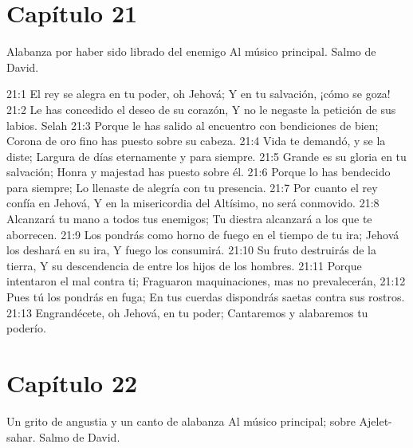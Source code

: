 \section*{Capítulo 21}
Alabanza por haber sido librado del enemigo 
Al músico principal. Salmo de David. 

21:1 El rey se alegra en tu poder, oh Jehová; 
Y en tu salvación, ¡cómo se goza! 
21:2 Le has concedido el deseo de su corazón, 
Y no le negaste la petición de sus labios. Selah 
21:3 Porque le has salido al encuentro con bendiciones de bien; 
Corona de oro fino has puesto sobre su cabeza. 
21:4 Vida te demandó, y se la diste; 
Largura de días eternamente y para siempre. 
21:5 Grande es su gloria en tu salvación; 
Honra y majestad has puesto sobre él. 
21:6 Porque lo has bendecido para siempre; 
Lo llenaste de alegría con tu presencia. 
21:7 Por cuanto el rey confía en Jehová, 
Y en la misericordia del Altísimo, no será conmovido. 
21:8 Alcanzará tu mano a todos tus enemigos; 
Tu diestra alcanzará a los que te aborrecen. 
21:9 Los pondrás como horno de fuego en el tiempo de tu ira; 
Jehová los deshará en su ira, 
Y fuego los consumirá. 
21:10 Su fruto destruirás de la tierra, 
Y su descendencia de entre los hijos de los hombres. 
21:11 Porque intentaron el mal contra ti; 
Fraguaron maquinaciones, mas no prevalecerán, 
21:12 Pues tú los pondrás en fuga; 
En tus cuerdas dispondrás saetas contra sus rostros. 
21:13 Engrandécete, oh Jehová, en tu poder; 
Cantaremos y alabaremos tu poderío. 
\section*{Capítulo 22}
Un grito de angustia y un canto de alabanza 
Al músico principal; sobre Ajelet-sahar. Salmo de David. 

